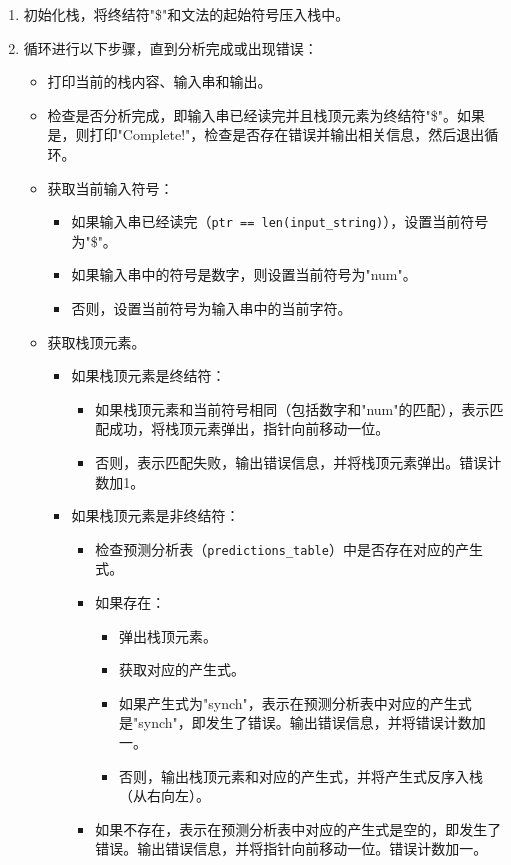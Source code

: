 \documentclass[lang=cn,11pt,a4paper]{elegantpaper}
\begin{document}
\begin{enumerate}
    \item 初始化栈，将终结符"\$"和文法的起始符号压入栈中。
    \item 循环进行以下步骤，直到分析完成或出现错误：
    \begin{itemize}
        \item 打印当前的栈内容、输入串和输出。
        \item 检查是否分析完成，即输入串已经读完并且栈顶元素为终结符"\$"。如果是，则打印"Complete!"，检查是否存在错误并输出相关信息，然后退出循环。
        \item 获取当前输入符号：
        \begin{itemize}
            \item 如果输入串已经读完（\lstinline{ptr == len(input_string)}），设置当前符号为"\$"。
            \item 如果输入串中的符号是数字，则设置当前符号为"num"。
            \item 否则，设置当前符号为输入串中的当前字符。
        \end{itemize}
        \item 获取栈顶元素。
        \begin{itemize}
            \item 如果栈顶元素是终结符：
            \begin{itemize}
                \item 如果栈顶元素和当前符号相同（包括数字和"num"的匹配），表示匹配成功，将栈顶元素弹出，指针向前移动一位。
                \item 否则，表示匹配失败，输出错误信息，并将栈顶元素弹出。错误计数加1。
            \end{itemize}
            \item 如果栈顶元素是非终结符：
            \begin{itemize}
                \item 检查预测分析表（\lstinline{predictions_table}）中是否存在对应的产生式。
                \item 如果存在：
                \begin{itemize}
                    \item 弹出栈顶元素。
                    \item 获取对应的产生式。
                    \item 如果产生式为"synch"，表示在预测分析表中对应的产生式是"synch"，即发生了错误。输出错误信息，并将错误计数加一。
                    \item 否则，输出栈顶元素和对应的产生式，并将产生式反序入栈（从右向左）。
                \end{itemize}
                \item 如果不存在，表示在预测分析表中对应的产生式是空的，即发生了错误。输出错误信息，并将指针向前移动一位。错误计数加一。
            \end{itemize}
        \end{itemize}
    \end{itemize}
\end{enumerate}
\end{document}
